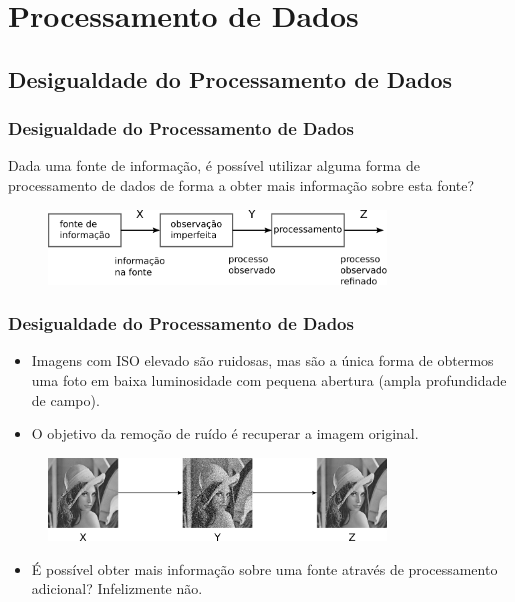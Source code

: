 \section{Processamento de Dados}
\subsection{Desigualdade do Processamento de Dados}

\begin{frame}%
  \frametitle{Desigualdade do Processamento de Dados}
  Dada uma fonte de informação, é possível utilizar alguma forma de processamento de dados
  de forma a obter mais informação sobre esta fonte?

  \begin{figure}[h!]
  \centering
  \includegraphics[width=0.8\textwidth]{images/proc-data.pdf}
  \label{fig:proc-data}
  \end{figure} 
\end{frame}

\begin{frame}%
  \frametitle{Desigualdade do Processamento de Dados}
  \begin{itemize}
  \item Imagens com ISO elevado são ruidosas, mas são a única forma de obtermos uma foto
        em baixa luminosidade com pequena abertura (ampla profundidade de campo).
  \item O objetivo da remoção de ruído é recuperar a imagem original.
  \end{itemize}

  \begin{figure}[h!]
  \centering
  \includegraphics[width=0.8\textwidth]{images/lena-denoising.png}
  \label{fig:lena-denoising}
  \end{figure}

  \begin{itemize}
  \item É possível obter mais informação sobre uma fonte através de processamento adicional?
  \pause
  Infelizmente não.
  \end{itemize}
\end{frame}

